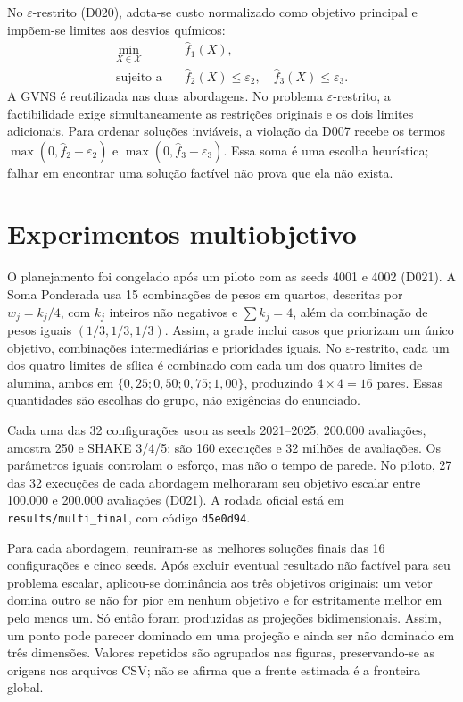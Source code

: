\documentclass[10pt,twocolumn,a4paper]{article}
\begin{document}
No $\varepsilon$-restrito (D020), adota-se custo normalizado como objetivo principal e impõem-se limites aos desvios químicos:
\begin{align}
\min_{X\in\mathcal{X}}\quad &\hat f_1(X),\\
\text{sujeito a}\quad &\hat f_2(X)\leq\varepsilon_2,\quad
\hat f_3(X)\leq\varepsilon_3.
\end{align}
A GVNS é reutilizada nas duas abordagens. No problema $\varepsilon$-restrito, a factibilidade exige simultaneamente as restrições originais e os dois limites adicionais. Para ordenar soluções inviáveis, a violação da D007 recebe os termos $\max(0,\hat f_2-\varepsilon_2)$ e $\max(0,\hat f_3-\varepsilon_3)$. Essa soma é uma escolha heurística; falhar em encontrar uma solução factível não prova que ela não exista.

\section{Experimentos multiobjetivo}

O planejamento foi congelado após um piloto com as seeds 4001 e 4002 (D021). A Soma Ponderada usa 15 combinações de pesos em quartos, descritas por $w_j=k_j/4$, com $k_j$ inteiros não negativos e $\sum k_j=4$, além da combinação de pesos iguais $(1/3,1/3,1/3)$. Assim, a grade inclui casos que priorizam um único objetivo, combinações intermediárias e prioridades iguais. No $\varepsilon$-restrito, cada um dos quatro limites de sílica é combinado com cada um dos quatro limites de alumina, ambos em $\{0{,}25;0{,}50;0{,}75;1{,}00\}$, produzindo $4\times4=16$ pares. Essas quantidades são escolhas do grupo, não exigências do enunciado.

Cada uma das 32 configurações usou as seeds 2021--2025, 200.000 avaliações, amostra 250 e SHAKE 3/4/5: são 160 execuções e 32 milhões de avaliações. Os parâmetros iguais controlam o esforço, mas não o tempo de parede. No piloto, 27 das 32 execuções de cada abordagem melhoraram seu objetivo escalar entre 100.000 e 200.000 avaliações (D021). A rodada oficial está em \texttt{results/multi\_final}, com código \texttt{d5e0d94}.

Para cada abordagem, reuniram-se as melhores soluções finais das 16 configurações e cinco seeds. Após excluir eventual resultado não factível para seu problema escalar, aplicou-se dominância aos três objetivos originais: um vetor domina outro se não for pior em nenhum objetivo e for estritamente melhor em pelo menos um. Só então foram produzidas as projeções bidimensionais. Assim, um ponto pode parecer dominado em uma projeção e ainda ser não dominado em três dimensões. Valores repetidos são agrupados nas figuras, preservando-se as origens nos arquivos CSV; não se afirma que a frente estimada é a fronteira global.
\end{document}
